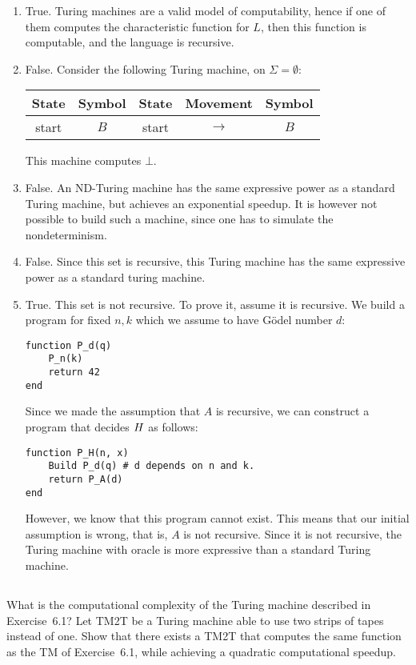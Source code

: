 \begin{solution}
\begin{enumerate}
	\item True.
	Turing machines are a valid model of computability,
	hence if one of them computes the characteristic function for \(L\),
	then this function is computable,
	and the language is recursive.
	\item False.
	Consider the following Turing machine, on \(\Sigma = \emptyset\):
	\begin{center}
	\begin{tabular}{|c|c||c|c|c|}
	\hline
	\textbf{State} & \textbf{Symbol} & \textbf{State} & \textbf{Movement} & \textbf{Symbol} \\
	\hline
	start & $B$ & start & $\to$ & $B$ \\
	\hline
	\end{tabular}
	\end{center}
	This machine computes \(\bot\).
	\item False.
	An ND-Turing machine has the same expressive power
	as a standard Turing machine, but achieves an exponential speedup.
	It is however not possible to build such a machine,
	since one has to simulate the nondeterminism.
	\item False.
	Since this set is recursive,
	this Turing machine has the same expressive power
	as a standard turing machine.
	\item True.
	This set is not recursive.
	To prove it, assume it is recursive.
	We build a program for fixed \(n, k\)
	which we assume to have Gödel number \(d\):
\begin{verbatim}
function P_d(q)
	P_n(k)
	return 42
end
\end{verbatim}
	Since we made the assumption that \(A\) is recursive,
	we can construct a program that decides \(H\) as follows:
\begin{verbatim}
function P_H(n, x)
	Build P_d(q) # d depends on n and k.
	return P_A(d)
end
\end{verbatim}
	However, we know that this program cannot exist.
	This means that our initial assumption is wrong, that is,
	\(A\) is not recursive.
	Since it is not recursive,
	the Turing machine with oracle
	is more expressive than a standard Turing machine.
\end{enumerate}
\end{solution}

\subsection{} %
What is the computational complexity of the Turing machine
described in Exercise~6.1?
Let TM2T be a Turing machine able to use two strips of tapes instead of one.
Show that there exists a TM2T that computes
the same function as the TM of Exercise~6.1,
while achieving a quadratic computational speedup.

